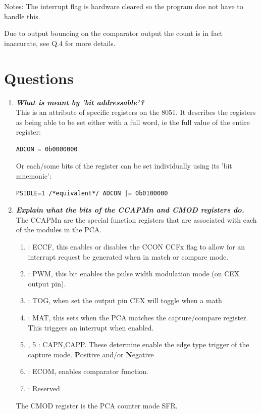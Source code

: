 \documentclass[11pt]{article}
\begin{document}
\begin{preview}
        Notes: The interrupt flag is hardware cleared so the program doe not have to handle this.

        Due to output bouncing on the comparator output the count is in fact inaccurate, see Q.4 for more details.

\section{Questions}
\begin{enumerate}
        \item \textit{\textbf{What is meant by 'bit addressable'?}} \\
        This is an attribute of specific registers on the 8051. It describes the registers as being able to be set either with a full word, ie the full value of the entire register: \begin{verbatim}ADCON = 0b0000000\end{verbatim}
        Or each/some bits of the register can be set individually using its 'bit mnemonic':
        \begin{verbatim}PSIDLE=1 /*equivalent*/ ADCON |= 0b0100000\end{verbatim}
        
        \item \textit{\textbf{Explain what the bits of the CCAPMn and CMOD registers do.}}\\
        The CCAPMn are the special function registers that are associated with each of the modules in the PCA.
        \begin{enumerate}[label=Bit \arabic* ]\addtocounter{enumii}{-1}
          \item : ECCF, this enables or disables the CCON CCFx flag to allow for an interrupt request be generated when in match or compare mode.
          \item : PWM, this bit enables the pulse width modulation mode (on CEX output pin). 
          \item : TOG, when set the output pin CEX will toggle when a math
          \item : MAT, this sets when the PCA matches the capture/compare register. This triggers an interrupt when enabled.
          \item, 5 : CAPN,CAPP. These determine enable the edge type trigger of the capture mode. \textbf{P}ositive and/or \textbf{N}egative 
          \addtocounter{enumii}{1}
          \item : ECOM, enables comparator function.
          \item : Reserved
        \end{enumerate}
        The CMOD register is the PCA counter mode SFR.


\end{enumerate}
\end{preview}
\end{document}
